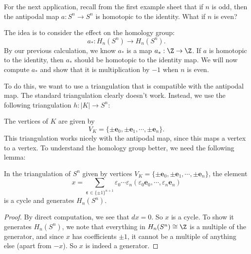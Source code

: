 \documentclass[a4paper]{article}
\begin{document}
For the next application, recall from the first example sheet that if $n$ is odd, then the antipodal map $a: S^n \to S^n$ is homotopic to the identity. What if $n$ is even?

The idea is to consider the effect on the homology group:
\[
  a_*: H_n(S^n) \to H_n(S^n).
\]
By our previous calculation, we know $a_*$ is a map $a_*: \Z \to \Z$. If $a$ is homotopic to the identity, then $a_*$ should be homotopic to the identity map. We will now compute $a_*$ and show that it is multiplication by $-1$ when $n$ is even.

To do this, we want to use a triangulation that is compatible with the antipodal map. The standard triangulation clearly doesn't work. Instead, we use the following triangulation $h: |K| \to S^n$:
\begin{center}
\end{center}
The vertices of $K$ are given by
\[
  V_K = \{\pm\mathbf{e}_0, \pm \mathbf{e}_1, \cdots, \pm\mathbf{e}_n\}.
\]
This triangulation works nicely with the antipodal map, since this maps a vertex to a vertex. To understand the homology group better, we need the following lemma:

\begin{lemma}
  In the triangulation of $S^n$ given by vertices $V_K = \{\pm\mathbf{e}_0, \pm \mathbf{e}_1, \cdots, \pm\mathbf{e}_n\}$, the element
  \[
    x = \sum_{\boldsymbol\varepsilon \in \{\pm 1\}^{n + 1}} \varepsilon_0 \cdots \varepsilon_n (\varepsilon_0 \mathbf{e}_0, \cdots, \varepsilon_n \mathbf{e}_n)
  \]
  is a cycle and generates $H_n(S^n)$.
\end{lemma}

\begin{proof}
  By direct computation, we see that $d x = 0$. So $x$ is a cycle. To show it generates $H_n(S^n)$, we note that everything in $H_n(S^n) \cong \Z$ is a multiple of the generator, and since $x$ has coefficients $\pm 1$, it cannot be a multiple of anything else (apart from $-x$). So $x$ is indeed a generator.
\end{proof}
\end{document}
